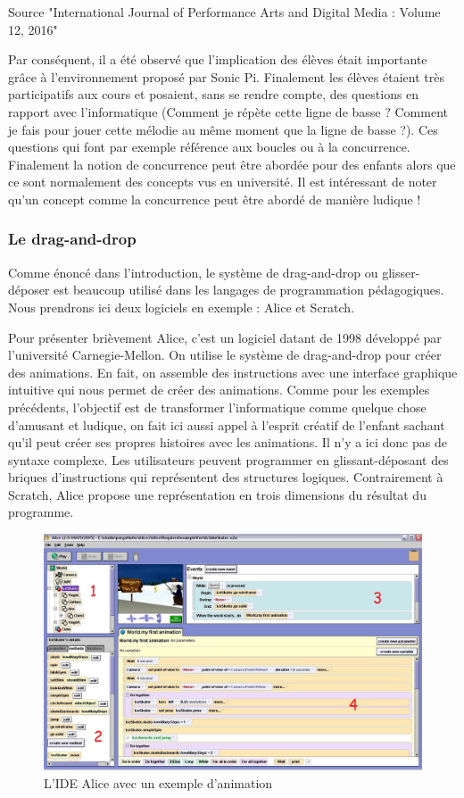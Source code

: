 Source "International Journal of Performance Arts and Digital
Media : Volume 12, 2016"

Par conséquent, il a été observé que l'implication des élèves était importante grâce à l'environnement proposé par Sonic Pi. Finalement les élèves étaient très participatifs aux cours et posaient, sans se rendre compte, des questions en rapport avec l'informatique (Comment je répète cette ligne de basse ?  Comment je fais pour jouer cette mélodie au même moment que la ligne de basse ?). Ces questions qui font par exemple référence aux boucles ou à la concurrence. Finalement la notion de concurrence peut être abordée pour des enfants alors que ce sont normalement des concepts vus en université. Il est intéressant de noter qu'un concept comme la concurrence peut être abordé de manière ludique !

\subsubsection{Le drag-and-drop}

Comme énoncé dans l'introduction, le système de drag-and-drop ou glisser-déposer est beaucoup utilisé dans les langages de programmation pédagogiques. Nous prendrons ici deux logiciels en exemple : Alice et Scratch.

Pour présenter brièvement Alice, c'est un logiciel datant de 1998 développé par l'université Carnegie-Mellon. On utilise le système de drag-and-drop pour créer des animations. En fait, on assemble des instructions avec une interface graphique intuitive qui nous permet de créer des animations. Comme pour les exemples précédents, l'objectif est de transformer l'informatique comme quelque chose d'amusant et ludique, on fait ici aussi appel à l'esprit créatif de l'enfant sachant qu'il peut créer ses propres histoires avec les animations. Il n'y a ici donc pas de syntaxe complexe. Les utilisateurs peuvent programmer en glissant-déposant des briques d'instructions qui représentent des structures logiques. Contrairement à Scratch, Alice propose une représentation en trois dimensions du résultat du programme.

\newpage

\begin{figure}[!htb]
  \centering
  \includegraphics[width=150mm,scale=0.5]{images/alice-ide.jpg}
  \caption{L'IDE Alice avec un exemple d'animation}
  \label{fig:boat1}
\end{figure}


